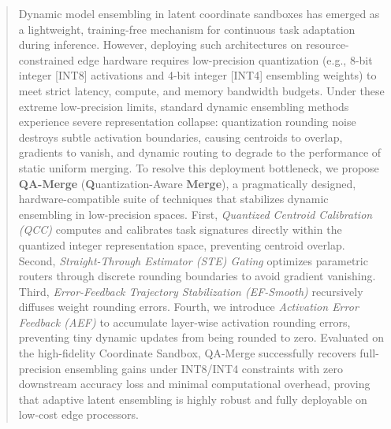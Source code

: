 \begin{abstract}
Dynamic model ensembling in latent coordinate sandboxes has emerged as a lightweight, training-free mechanism for continuous task adaptation during inference. However, deploying such architectures on resource-constrained edge hardware requires low-precision quantization (e.g., 8-bit integer [INT8] activations and 4-bit integer [INT4] ensembling weights) to meet strict latency, compute, and memory bandwidth budgets. Under these extreme low-precision limits, standard dynamic ensembling methods experience severe representation collapse: quantization rounding noise destroys subtle activation boundaries, causing centroids to overlap, gradients to vanish, and dynamic routing to degrade to the performance of static uniform merging. To resolve this deployment bottleneck, we propose \textbf{QA-Merge} (\textbf{Q}uantization-Aware \textbf{Merge}), a pragmatically designed, hardware-compatible suite of techniques that stabilizes dynamic ensembling in low-precision spaces. First, \emph{Quantized Centroid Calibration (QCC)} computes and calibrates task signatures directly within the quantized integer representation space, preventing centroid overlap. Second, \emph{Straight-Through Estimator (STE) Gating} optimizes parametric routers through discrete rounding boundaries to avoid gradient vanishing. Third, \emph{Error-Feedback Trajectory Stabilization (EF-Smooth)} recursively diffuses weight rounding errors. Fourth, we introduce \emph{Activation Error Feedback (AEF)} to accumulate layer-wise activation rounding errors, preventing tiny dynamic updates from being rounded to zero. Evaluated on the high-fidelity Coordinate Sandbox, QA-Merge successfully recovers full-precision ensembling gains under INT8/INT4 constraints with zero downstream accuracy loss and minimal computational overhead, proving that adaptive latent ensembling is highly robust and fully deployable on low-cost edge processors.
\end{abstract}
